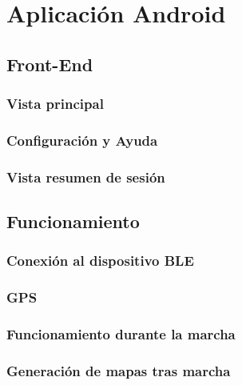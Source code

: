 \cleardoublepage

\chapter{Aplicación Android}
\label{makereference6}

\section{Front-End}
\label{makereference6.1}

\subsection{Vista principal}
\label{makereference6.1.1}

\subsection{Configuración y Ayuda}
\label{makereference6.1.2}

\subsection{Vista resumen de sesión}
\label{makereference6.1.3}

\section{Funcionamiento}
\label{makereference6.2}

\subsection{Conexión al dispositivo BLE}
\label{makereference6.2.1}

\subsection{GPS}
\label{makereference6.2.2}

\subsection{Funcionamiento durante la marcha}
\label{makereference6.2.3}

\subsection{Generación de mapas tras marcha}
\label{makereference6.2.4}